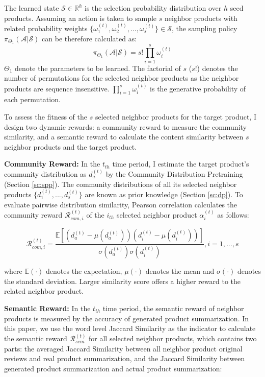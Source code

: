 The learned state $\mathcal{S} \in \mathbb{R}^{h}$ is the selection probability distribution over $h$ seed products. Assuming an action is taken to sample $s$ neighbor products with related probability weights $\{\omega_{1}^{(t)},\omega_{2}^{(t)},...,\omega_{s}^{(t)}\} \in \mathcal{S}$, the sampling policy $\pi_{\Theta_{1}}(\mathcal{A}|\mathcal{S})$ can be therefore calculated as:
\begin{equation}
\pi_{\Theta_{1}}(\mathcal{A}|\mathcal{S}) = s!\prod_{i=1}^{s}\omega^{(t)}_{i}
\end{equation} 
$\Theta_{1}$ denote the parameters to be learned. The factorial of $s$ ($s!$) denotes the number of permutations for the selected neighbor products as the neighbor products are sequence insensitive. $\prod_{i=1}^{s}\omega^{(t)}_{i}$ is the generative probability of each permutation. 

To assess the fitness of the $s$ selected neighbor products for the target product, I design two dynamic rewards: a community reward to measure the community similarity, and a semantic reward to calculate the content similarity between $s$ neighbor products and the target product.

\textbf{Community Reward:} 
In the $t_{th}$ time period, I estimate the target product's community distribution as $d^{(t)}_{a}$ by the Community Distribution Pretraining (Section \ref{sc:spp}). The community distributions of all its selected neighbor products $\{d^{(t)}_{1},...,d^{(t)}_{s}\}$ are known as prior knowledge (Section \ref{sc:dp}). To evaluate pairwise distribution similarity, Pearson correlation calculates the community reward $ \mathcal{R}_{com,i}^{(t)}$ of the $i_{th}$ selected neighbor product $\alpha_{i}^{(t)}$ as follows:

\begin{equation}
\mathcal{R}_{com,i}^{(t)} = \frac{\mathbb{E}[(d_{a}^{(t)}-\mu(d_{a}^{(t)}))(d_{i}^{(t)}-\mu(d_{i}^{(t)}))]}{\sigma(d_{a}^{(t)})\sigma(d_{i}^{(t)})}, i = 1,...,s
\end{equation}

where $\mathbb{E}(\cdot)$ denotes the expectation, $\mu(\cdot)$ denotes the mean and $\sigma(\cdot)$ denotes the standard deviation. Larger similarity score offers a higher reward to the related neighbor product.

\textbf{Semantic Reward:} In the $t_{th}$ time period, the semantic reward of neighbor products is measured by the accuracy of generated product summarization. In this paper, we use the word level Jaccard Similarity as the indicator to calculate the semantic reward $\mathcal{R}_{sem}^{(t)}$ for all selected neighbor products, which contains two parts: the averaged Jaccard Similarity between all neighbor product original reviews and real product summarization, and the Jaccard Similarity between generated product summarization and actual product summarization:

